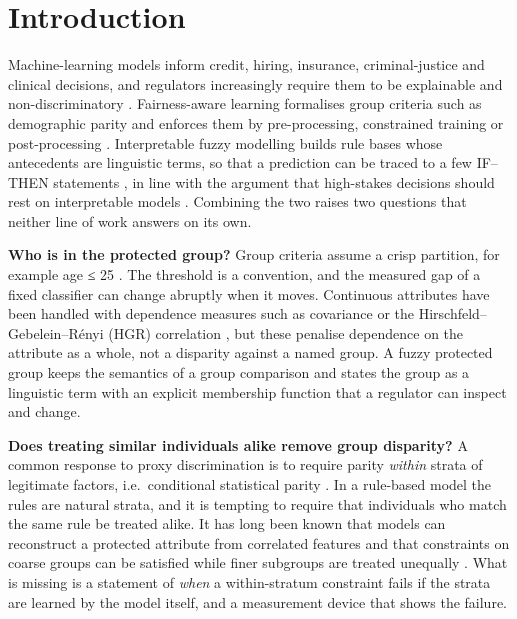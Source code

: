 \hypertarget{introduction}{%
\section{Introduction}\label{introduction}}

Machine-learning models inform credit, hiring, insurance, criminal-justice and clinical decisions, and regulators increasingly require them to be explainable and non-discriminatory \cite{aiact}. Fairness-aware learning formalises group criteria such as demographic parity and enforces them by pre-processing, constrained training or post-processing \cite{zafar,mehrabi,pessach,agarwal,zhang}. Interpretable fuzzy modelling builds rule bases whose antecedents are linguistic terms, so that a prediction can be traced to a few IF--THEN statements \cite{alonso,gacto2011,casillas,mendel}, in line with the argument that high-stakes decisions should rest on interpretable models \cite{rudin}. Combining the two raises two questions that neither line of work answers on its own.

\textbf{Who is in the protected group?} Group criteria assume a crisp partition, for example age ≤ 25 \cite{lequy}. The threshold is a convention, and the measured gap of a fixed classifier can change abruptly when it moves. Continuous attributes have been handled with dependence measures such as covariance \cite{zafar} or the Hirschfeld--Gebelein--Rényi (HGR) correlation \cite{mary}, but these penalise dependence on the attribute as a whole, not a disparity against a named group. A fuzzy protected group keeps the semantics of a group comparison and states the group as a linguistic term with an explicit membership function that a regulator can inspect and change.

\textbf{Does treating similar individuals alike remove group disparity?} A common response to proxy discrimination is to require parity \emph{within} strata of legitimate factors, i.e.~conditional statistical parity \cite{kamiran2013,corbett}. In a rule-based model the rules are natural strata, and it is tempting to require that individuals who match the same rule be treated alike. It has long been known that models can reconstruct a protected attribute from correlated features \cite{pedreschi,lipton} and that constraints on coarse groups can be satisfied while finer subgroups are treated unequally \cite{kearns}. What is missing is a statement of \emph{when} a within-stratum constraint fails if the strata are learned by the model itself, and a measurement device that shows the failure.

